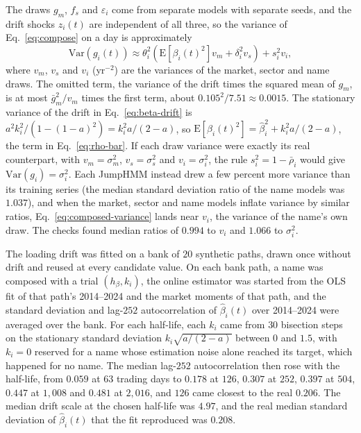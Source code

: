The draws $g_m$, $f_s$ and $\varepsilon_i$ come from separate models with separate seeds, and the drift shocks
$z_i(t)$ are independent of all three, so the variance of Eq.~\eqref{eq:compose} on a day is approximately
\begin{equation}
  \mathrm{Var}\left(g_i(t)\right) \approx \theta_i^2 \left(\mathrm{E}\left[\beta_i(t)^2\right] v_m
    + \delta_i^2 v_s\right) + s_i^2 v_i,
  \label{eq:composed-variance}
\end{equation}
where $v_m$, $v_s$ and $v_i$ (yr$^{-2}$) are the variances of the market, sector and name draws. The omitted term,
the variance of the drift times the squared mean of $g_m$, is at most $\bar g_m^2/v_m$ times the first term, about
$0.105^2/7.51 \approx 0.0015$. The stationary
variance of the drift in Eq.~\eqref{eq:beta-drift} is $a^2 k_i^2/(1 - (1-a)^2) = k_i^2 a/(2-a)$, so
$\mathrm{E}[\beta_i(t)^2] = \hat\beta_i^2 + k_i^2 a/(2-a)$, the term in Eq.~\eqref{eq:rho-bar}. If each draw
variance were exactly its real counterpart, with $v_m = \sigma_m^2$, $v_s = \sigma_s^2$ and $v_i = \sigma_i^2$, the
rule $s_i^2 = 1 - \bar\rho_i$ would give $\mathrm{Var}(g_i) = \sigma_i^2$. Each JumpHMM instead drew a few percent
more variance than its training series (the median standard deviation ratio of the name models was $1.037$), and when
the market, sector and name models inflate variance by similar ratios, Eq.~\eqref{eq:composed-variance} lands near
$v_i$, the variance of the name's own draw.
The checks found median ratios of $0.994$ to $v_i$ and $1.066$ to $\sigma_i^2$.

The loading drift was fitted on a bank of $20$ synthetic paths, drawn once without drift and reused at every
candidate value. On each bank path, a name was composed with a trial $(h_\beta, k_i)$, the online estimator was
started from the OLS fit of that path's 2014--2024 and the market moments of that path, and the standard deviation and
lag-$252$ autocorrelation of $\hat\beta_i(t)$ over 2014--2024 were averaged over the bank. For each half-life, each
$k_i$ came from $30$ bisection steps on the stationary standard deviation $k_i\sqrt{a/(2-a)}$ between $0$ and $1.5$,
with $k_i = 0$ reserved for a name whose estimation noise alone reached its target, which happened for no name. The
median lag-$252$ autocorrelation then rose with the half-life, from $0.059$ at $63$ trading days to $0.178$ at $126$,
$0.307$ at $252$, $0.397$ at $504$, $0.447$ at $1{,}008$ and $0.481$ at $2{,}016$, and $126$ came closest to the real
$0.206$. The median drift scale at the chosen half-life was $4.97$, and the real median standard deviation of
$\hat\beta_i(t)$ that the fit reproduced was $0.208$.

